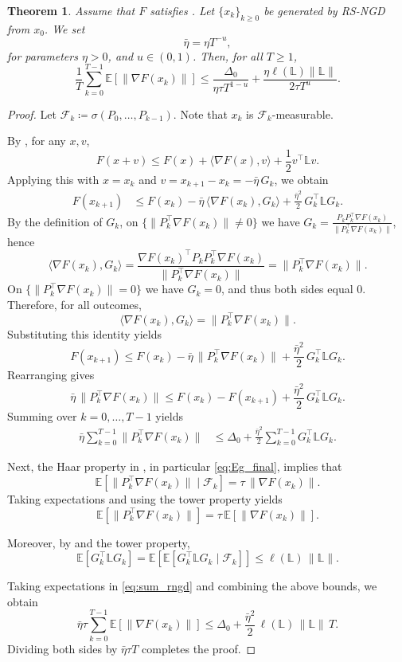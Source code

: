 \documentclass[10pt]{article}
\newtheorem{theorem}{Theorem}[section]
\begin{document}
\begin{theorem}\label{thm:RNGD_exp}
Assume that $F$ satisfies .
Let $\{x_k\}_{k\ge0}$ be generated by RS-NGD from $x_0$.
We set
\[
\bar{\eta} = \eta T^{-u},
\]
for parameters $\eta > 0$, and $u \in (0,1)$.
Then, for all $T\ge1$,
\[
 \frac{1}{T}\sum_{k=0}^{T-1} \mathbb{E}\!\left[\|\nabla F(x_k)\|\right]
 \le
 \frac{\Delta_0 }{\eta \tau T^{1-u}}
 +\frac{\eta \ell(\mathbb{L})\|\mathbb{L}\|}{2\tau T^u}.
\]
\end{theorem}
\begin{proof}
Let $\mathcal{F}_k \coloneqq \sigma(P_0,\dots,P_{k-1})$.
Note that $x_k$ is $\mathcal{F}_k$-measurable.

By , for any $x,v$,
\[
F(x+v)
\le
F(x)+\langle \nabla F(x),v\rangle+\frac{1}{2}v^\top\mathbb{L}v .
\]
Applying this with $x=x_k$ and $v=x_{k+1}-x_k=-\bar{\eta}\,G_k$, we obtain
\begin{align*}
F(x_{k+1})
&\le
F(x_k)-\bar{\eta}\,\langle \nabla F(x_k),G_k\rangle
+\frac{\bar{\eta}^2}{2}\,G_k^\top\mathbb{L}G_k.
\end{align*}
By the definition of $G_k$, on $\{\|P_k^\top\nabla F(x_k)\|\neq0\}$ we have
$G_k=\frac{P_kP_k^\top\nabla F(x_k)}{\|P_k^\top\nabla F(x_k)\|}$, hence
\[
\langle \nabla F(x_k),G_k\rangle
=
\frac{\nabla F(x_k)^\top P_kP_k^\top \nabla F(x_k)}{\|P_k^\top \nabla F(x_k)\|}
=
\|P_k^\top \nabla F(x_k)\|.
\]
On $\{\|P_k^\top\nabla F(x_k)\|=0\}$ we have $G_k=0$, and thus both sides equal $0$.
Therefore, for all outcomes,
\[
\langle \nabla F(x_k),G_k\rangle=\|P_k^\top\nabla F(x_k)\|.
\]
Substituting this identity yields
\[
F(x_{k+1})
\le
F(x_k)-\bar{\eta}\,\|P_k^\top\nabla F(x_k)\|
+\frac{\bar{\eta}^2}{2}\,G_k^\top\mathbb{L}G_k.
\]
Rearranging gives
\[
\bar{\eta}\,\|P_k^\top\nabla F(x_k)\|
\le
F(x_k)-F(x_{k+1})
+\frac{\bar{\eta}^2}{2}\,G_k^\top\mathbb{L}G_k.
\]
Summing over $k=0,\dots,T-1$ yields
\begin{align}
\bar{\eta}\sum_{k=0}^{T-1}\|P_k^\top\nabla F(x_k)\|
&\le
\Delta_0
+\frac{\bar{\eta}^2}{2}\sum_{k=0}^{T-1}G_k^\top\mathbb{L}G_k .
\label{eq:sum_rngd}
\end{align}

Next, the Haar property in , in particular
\eqref{eq:Eg_final}, implies that
\[
\mathbb{E}\!\left[\|P_k^\top\nabla F(x_k)\|\mid \mathcal{F}_k\right]
=
\tau\,\|\nabla F(x_k)\|.
\]
Taking expectations and using the tower property yields
\[
\mathbb{E}\!\left[\|P_k^\top\nabla F(x_k)\|\right]
=
\tau\,\mathbb{E}\!\left[\|\nabla F(x_k)\|\right].
\]

Moreover, by  and the tower property,
\[
\mathbb{E}\!\left[G_k^\top\mathbb{L}G_k\right]
=
\mathbb{E}\!\left[
\mathbb{E}\!\left[G_k^\top\mathbb{L}G_k \mid \mathcal{F}_k\right]
\right]
\le
\ell(\mathbb{L})\,\|\mathbb{L}\|.
\]

Taking expectations in \eqref{eq:sum_rngd} and combining the above bounds,
we obtain
\[
\bar{\eta}\tau \sum_{k=0}^{T-1}\mathbb{E}\!\left[\|\nabla F(x_k)\|\right]
\le
\Delta_0
+\frac{\bar{\eta}^2}{2}\,\ell(\mathbb{L})\,\|\mathbb{L}\|\,T.
\]
Dividing both sides by $\bar{\eta}\tau T$ completes the proof.
\end{proof}
\end{document}
